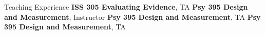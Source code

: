 \begin{rubric}{Teaching Experience}
\entry*[Fall 2018]\textbf{ISS 305 Evaluating Evidence}, TA
\entry*[Summer 2017] \textbf{Psy 395 Design and Measurement}, Instructor
\entry*[Spring 2017] \textbf{Psy 395 Design and Measurement}, TA
\entry*[Fall 2016] \textbf{Psy 395 Design and Measurement}, TA
\end{rubric}